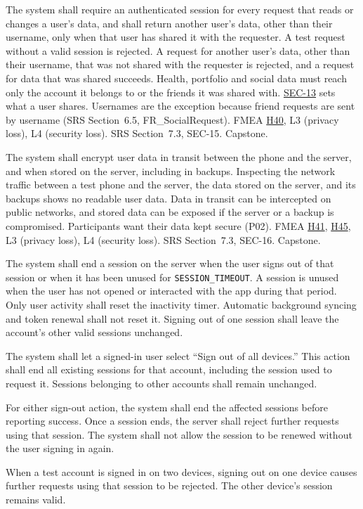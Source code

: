 \documentclass{article}
\newcommand{\reqref}[1]{\hyperref[req:#1]{#1}}
\newcommand{\hazref}[1]{\hyperref[#1]{#1}}
\begin{document}
\begin{description}

{The system shall require an authenticated session for every request that reads
or changes a user's data, and shall return another user's data, other than
their username, only when that user has shared it with the requester.}
{A test request without a valid session is rejected. A request for another
user's data, other than their username, that was not shared with the requester
is rejected, and a request for data that was shared succeeds.}
{Health, portfolio and social data must reach only the account it
belongs to or the friends it was shared with. \reqref{SEC-13} sets what a user
shares. Usernames are the exception because friend requests are sent by
username (SRS Section~6.5, FR\_SocialRequest).}
{FMEA \hazref{H40}, L3 (privacy loss), L4 (security loss).}
{SRS Section~7.3, SEC-15.}
{Capstone.}

{The system shall encrypt user data in transit between the phone and the
server, and when stored on the server, including in backups.}
{Inspecting the network traffic between a test phone and the server, the data
stored on the server, and its backups shows no readable user data.}
{Data in transit can be intercepted on public networks, and stored data can be
exposed if the server or a backup is compromised. Participants want their data
kept secure (P02).}
{FMEA \hazref{H41}, \hazref{H45}, L3 (privacy loss), L4 (security loss).}
{SRS Section~7.3, SEC-16.}
{Capstone.}

{The system shall end a session on the server when the user signs out of that session or when it has been unused for \texttt{SESSION\_TIMEOUT}. A session is unused when the user has not opened or interacted with the app during that period. Only user activity shall reset the inactivity timer. Automatic background syncing and token renewal shall not reset it. Signing out of one session shall leave the account's other valid sessions unchanged.

The system shall let a signed-in user select ``Sign out of all devices.'' This action shall end all existing sessions for that account, including the session used to request it. Sessions belonging to other accounts shall remain unchanged.

For either sign-out action, the system shall end the affected sessions before reporting success. Once a session ends, the server shall reject further requests using that session. The system shall not allow the session to be renewed without the user signing in again.}
{When a test account is signed in on two devices, signing out on one device causes further requests using that session to be rejected. The other device's session remains valid.

}
\end{description}
\end{document}
